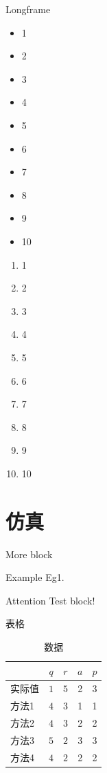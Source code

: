 \documentclass[hyperref,UTF8,10pt]{beamer}
\numberwithin{equation}{section} %
\begin{document}
\begin{frame}[allowframebreaks]{Longframe}
    \begin{itemize}
        \item 1
        \item 2
        \item 3
        \item 4
        \item 5
        \item 6
        \item 7
        \item 8
        \item 9
        \item 10
    \end{itemize}
    \begin{enumerate}
        \item 1
        \item 2
        \item 3
        \item 4
        \item 5
        \item 6
        \item 7
        \item 8
        \item 9
        \item 10
    \end{enumerate}
\end{frame}

\section{仿真}

\begin{frame}{More block}
    \begin{example}{Example}
    Eg1.
    \end{example}
    \begin{alert}{Attention}
        Test block!
    \end{alert}
\end{frame}

\begin{frame}{表格}
    \begin{table}[]
        \centering
        \caption{数据}
        \label{tab1}
        \begin{tabular}{p{3cm}cccc}
        \toprule
        & $q$    & $r$ & $a$ & $p$           \\ 
        \midrule
        实际值   & $1$  & $5$  & 2   & 3  \\
        方法1    & $4$ & $3$ & 1 & 1\\
        方法2    & $4$ & $3$ & 2 & 2\\
        方法3    & $5$ & $2$ & 3 & 3\\
        方法4    & $4$ & $2$ & 2 & 2\\ \bottomrule
        \end{tabular}
    \end{table}
\end{frame}
\end{document}
